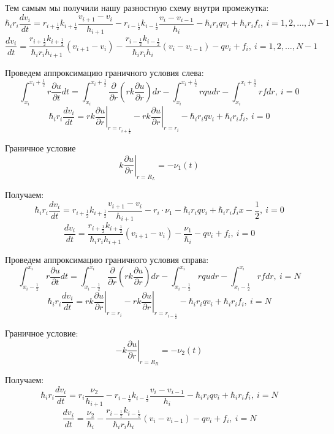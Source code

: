 Тем самым мы получили нашу разностную схему внутри промежутка:
\[
  \hbar_i r_i \frac{d v_i}{dt} = r_{i + \frac{1}{2}} k_{i + \frac{1}{2}} \frac{v_{i+1}-v_i}{h_{i + 1}} 
  - r_{i - \frac{1}{2}} k_{i - \frac{1}{2}} \frac{v_{i}-v_{i-1}}{h_{i}} -\hbar_i r_i q v_i + \hbar_i r_i f_i,\ i = 1, 2, \dots, N-1
\]
\[
  \frac{d v_i}{dt} = \frac{r_{i + \frac{1}{2}} k_{i + \frac{1}{2}}}{\hbar_i r_i h_{i + 1}} (v_{i+1}-v_i)
  - \frac{r_{i - \frac{1}{2}} k_{i - \frac{1}{2}}}{\hbar_i r_i h_{i}} (v_{i}-v_{i-1}) - q v_i + f_i,\ i = 1, 2, \dots, N-1
\]

Проведем аппроксимацию граничного условия слева:
\[
  \int^{x_i+\frac{1}{2}}_{x_i} r \frac{\partial u}{\partial t} dt =
  \int^{x_i+\frac{1}{2}}_{x_i} \frac{\partial}{\partial r} \left ( rk\frac{\partial u}{\partial r} \right ) dr
  - \int^{x_i+\frac{1}{2}}_{x_i} rqu dr - \int^{x_i+\frac{1}{2}}_{x_i} rf dr,\ i = 0
\]
\[
  \hbar_i r_i \frac{d v_i}{dt} = \left . rk \frac{\partial u}{\partial r} \right \vert_{r=r_{i+\frac{1}{2}}}
  - \left . rk \frac{\partial u}{\partial r} \right \vert_{r=r_i} -\hbar_i r_i q v_i + \hbar_i r_i f_i,\ i = 0
\]

Граничное условие
\[
  k \left. \frac{\partial u}{\partial r}\right\vert_{r = R_L} = -\nu_1(t)
\]

Получаем:
\[
  \hbar_i r_i \frac{d v_i}{dt} = r_{i + \frac{1}{2}} k_{i + \frac{1}{2}} \frac{v_{i+1}-v_i}{h_{i + 1}} 
  - r_i \cdot \nu_1 - \hbar_i r_i q v_i + \hbar_i r_i f_ix-\frac{1}{2},\ i = 0
\]
\[
  \frac{d v_i}{dt} = \frac{r_{i + \frac{1}{2}} k_{i + \frac{1}{2}}}{\hbar_i r_i h_{i + 1}} (v_{i+1}-v_i)
  - \frac{\nu_1}{\hbar_i} - q v_i + f_i,\ i = 0
\]

Проведем аппроксимацию граничного условия справа:
\[
  \int^{x_i}_{x_i-\frac{1}{2}} r \frac{\partial u}{\partial t} dt =
  \int^{x_i}_{x_i-\frac{1}{2}} \frac{\partial}{\partial r} \left ( rk\frac{\partial u}{\partial r} \right ) dr
  - \int^{x_i}_{x_i-\frac{1}{2}} rqu dr - \int^{x_i}_{x_i-\frac{1}{2}} rf dr,\ i = N
\]
\[
  \hbar_i r_i \frac{d v_i}{dt} = \left . rk \frac{\partial u}{\partial r} \right \vert_{r=r_i}
  - \left . rk \frac{\partial u}{\partial r} \right \vert_{r=r_{i-\frac{1}{2}}} -\hbar_i r_i q v_i + \hbar_i r_i f_i,\ i = N
\]

Граничное условие:
\[
  -k \left. \frac{\partial u}{\partial r}\right\vert_{r = R_R} = -\nu_2(t)
\]

Получаем:
\[
  \hbar_i r_i \frac{d v_i}{dt} = r_{i } \frac{\nu_2}{h_{i + 1}} 
  - r_{i - \frac{1}{2}} k_{i - \frac{1}{2}} \frac{v_{i}-v_{i-1}}{h_{i}} -\hbar_i r_i q v_i + \hbar_i r_i f_i,\ i = N
\]
\[
  \frac{d v_i}{dt} = \frac{\nu_2}{\hbar_i}
  - \frac{r_{i - \frac{1}{2}} k_{i - \frac{1}{2}}}{\hbar_i r_i h_{i}} (v_{i}-v_{i-1}) - q v_i + f_i,\ i = N
\]

